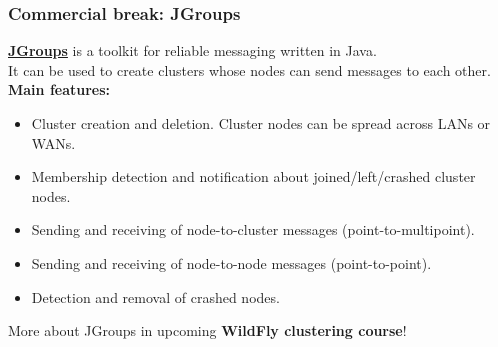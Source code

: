 \documentclass[10pt,utf8]{beamer}
\begin{document}
\begin{frame}
	\frametitle{Commercial break: JGroups}
	\href{http://jgroups.org/}{\color{blue}\textbf{JGroups}} is a toolkit for reliable messaging written in Java. \\
	It can be used to create clusters whose nodes can send messages to each other.\\
	\vspace{0.5cm}
	\textbf{Main features:}
	\begin{itemize}
		\pause
		\item Cluster creation and deletion. Cluster nodes can be spread across LANs or WANs.
		\pause
		\item Membership detection and notification about joined/left/crashed cluster nodes.
		\pause
		\item Sending and receiving of node-to-cluster messages (point-to-multipoint).
		\pause
		\item Sending and receiving of node-to-node messages (point-to-point).
		\pause
		\item Detection and removal of crashed nodes.
	\end{itemize}
	More about JGroups in upcoming \textbf{WildFly clustering course}!
\end{frame}
\end{document}

